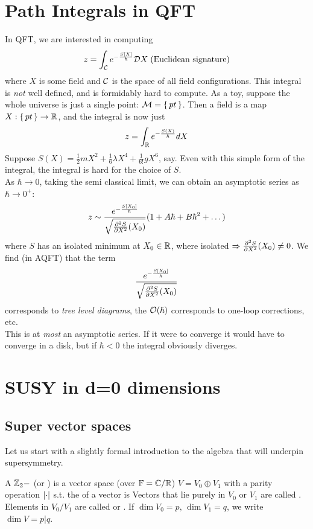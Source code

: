 \documentclass{article}
\begin{document}
\section{Path Integrals in QFT}
In QFT, we are interested in computing 
\[
z = \int_\mc{C} e^{-\frac{S[X]}{\hbar}} \mc{D}X \; \text{(Euclidean signature)}
\]
where $X$ is some field and $\mc{C}$ is the space of all field configurations. This integral is \emph{not} well defined, and is formidably hard to compute. 
As a toy, suppose the whole universe is just a single point: $\mc{M} = \set{pt}$. Then a field is a map $X:\set{pt} \to \mbb{R}$, and the integral is now just 
\[
z = \int_\mbb{R} e^{-\frac{S(X)}{\hbar}} dX
\]
Suppose $S(X) = \frac{1}{2}mX^2 + \frac{1}{6}\lambda X^4 +\frac{1}{6!} gX^6$, say. Even with this simple form of the integral, the integral is hard for the choice of $S$. \\
As $\hbar \to 0$, taking the semi classical limit, we can obtain an asymptotic series as $\hbar \to 0^+$: 
\[
z \sim \frac{e^{-\frac{S[X_0]}{\hbar}}}{\sqrt{\pds[S]{X}(X_0)}}(1+A\hbar + B\hbar^2+\dots)
\]
where $S$ has an isolated minimum at $X_0\in\mbb{R}$, where isolated $\Rightarrow \pds[S]{X}(X_0) \neq0$. We find (in AQFT) that the term \[
\frac{e^{-\frac{S[X_0]}{\hbar}}}{\sqrt{\pds[S]{X}(X_0)}}
\]
corresponds to \emph{tree level diagrams}, the $\mc{O}(\hbar)$ corresponds to one-loop corrections, etc. \\
This is at \emph{most} an asymptotic series. If it were to converge it would have to converge in a disk, but if $\hbar < 0$ the integral obviously diverges. 

\section{SUSY in d=0 dimensions}
\subsection{Super vector spaces}
Let us start with a slightly formal introduction to the algebra that will underpin supersymmetry. 

\begin{definition}
	A $\mbb{Z}_2-$ (or ) is a vector space (over $\mbb{F}= \mbb{C}/\mbb{R}$) $V = V_0 \oplus V_1$ with a parity operation $\abs{\cdot}$  s.t. the  of a vector is 
Vectors that lie purely in $V_0$ or $V_1$ are called . Elements in $V_0 / V_1$ are called  or . If $\dim V_{0}=p, \, \dim V_1 = q$, we write $\dim V = p | q$.
\end{definition}
\end{document}
